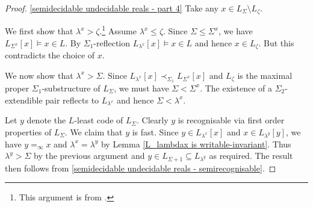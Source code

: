 \documentclass[a4paper,11pt]{amsart}
\theoremstyle{definition}
\newtheorem*{problem A}{Problem 1}
\newtheorem*{problem B}{Problem 2}
\theoremstyle{remark}
\begin{document}
\begin{proof}
\ref{semidecidable undecidable reals - part 4}
Take any $x\in L_\Sigma \setminus L_\zeta$. 

We first show that $\lambda^{x}>\zeta$.\footnote{This argument is from \cite[Theorem 2.6 (3)]{W}.}  
Assume $\lambda^{x}\leq\zeta$. 
Since $\Sigma\leq\Sigma^{x}$, we have 
$L_{\Sigma^{x}}[x]\models x\in L$. 
By $\Sigma_1$-reflection $L_{\lambda^{x}}[x]\models x\in L$ and hence $x\in L_\zeta$. 
But this contradicts the choice of $x$. 
 
We now show that $\lambda^{x}>\Sigma$. 
Since $L_{\lambda^{x}}[x]\prec_{\Sigma_{1}}L_{\Sigma^{x}}[x]$ and 
 $L_{\zeta}$ is the maximal proper  $\Sigma_{1}$-substructure of $L_{\Sigma}$, 
 we must have $\Sigma<\Sigma^{x}$. %
 The existence of a $\Sigma_2$-extendible pair reflects to $L_{\lambda^x}$ and hence $\Sigma<\lambda^x$. 
  
  
  Let $y$ denote the $L$-least code of $L_{\Sigma}$. 
  Clearly $y$ is recognisable via first order properties of $L_\Sigma$. 
We claim that $y$ is fast. 
Since $y\in L_{\lambda^{x}}[x]$ and $x\in L_{\lambda^{y}}[y]$, we have ${y}=_{\infty}{x}$ and $\lambda^x=\lambda^y$ by Lemma \ref{L_lambdax is writable-invariant}. 
Thus $\lambda^y>\Sigma$ by the previous argument and $y \in L_{\Sigma+1}\subseteq  L_{\lambda^{y}}$ as required. 
The result then follows from \ref{semidecidable undecidable reals - semirecognisable}.
   \end{proof}

\end{document}
